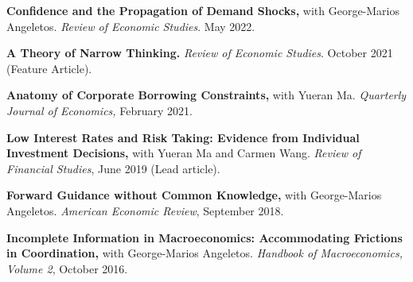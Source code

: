 \documentclass[line]{res}
\newenvironment{list1}{
  \begin{list}{\ding{113}}{%
      \setlength{\itemsep}{0.07in}
      \setlength{\parsep}{0in} \setlength{\parskip}{0in}
		\setlength{\topsep}{0.07in} \setlength{\partopsep}{0in}
      \setlength{\leftmargin}{0.0in}}}{\end{list}}
\begin{document}
\begin{resume}
\begin{list1}
\vspace{0.2cm}

\item[] \textbf{Confidence and the Propagation of Demand Shocks,} with George-Marios Angeletos. \emph{Review of Economic Studies}. May 2022.
\vspace{0.2cm}

\item[] \textbf{A Theory of Narrow Thinking.}  \emph{Review of Economic Studies}. October 2021 (Feature Article).
\vspace{0.2cm}


\item[] \textbf{Anatomy of Corporate Borrowing Constraints,} with Yueran Ma. \emph{Quarterly Journal of Economics,} February 2021.
\vspace{0.2cm}
\item[] \textbf{Low Interest Rates and Risk Taking: Evidence from Individual Investment Decisions,} with Yueran Ma and Carmen Wang. \emph{Review of Financial Studies}, June 2019 (Lead article).
\vspace{0.2cm}

\item[] \textbf{Forward Guidance without Common Knowledge,} with George-Marios Angeletos. \emph{American Economic Review}, September 2018.
\vspace{0.2cm}

\item[]
\textbf{Incomplete Information in Macroeconomics: Accommodating Frictions in Coordination,} with George-Marios Angeletos. \emph{Handbook of Macroeconomics, Volume 2}, October 2016.

\end{list1}
%





\end{resume}
\end{document}
